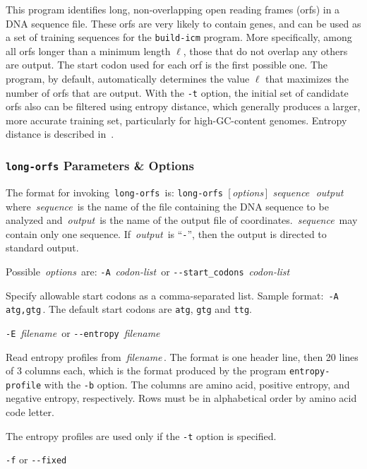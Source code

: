 \documentclass[fleqn,titlepage,11pt]{article}
\def\Desc#1{\,\mbox{\emph{#1}}\,}
\def\Pg#1{\texttt{#1}}
\begin{document}
This program identifies long, non-overlapping open reading frames (orfs)
in a DNA sequence file.  These orfs are very likely to contain genes,
and can be used as a set of training sequences for the \Pg{build-icm}
program.  More specifically, among all orfs longer than a minimum length
$\ell$, those that do not overlap any others are output.  The start
codon used for each orf is the first possible one.  The program, by
default, automatically determines the value $\ell$ that maximizes the
number of orfs that are output.  With the \Pg{-t} option, the initial
set of candidate orfs also can be filtered using entropy distance, which
generally produces a larger, more accurate training set, particularly
for high-GC-content genomes.  Entropy distance is described in~\cite{med1}.

\subsubsection{\Pg{long-orfs} Parameters \& Options}
The format for invoking \,\Pg{long-orfs}\, is:
\bq
  \Pg{long-orfs}\, [\Desc{options}] \Desc{sequence} \Desc{output}
\eq
where \Desc{sequence} is the name of the file containing the DNA sequence
to be analyzed and \Desc{output} is the name of the output file of
coordinates.  \Desc{sequence} may contain only one sequence.
If \Desc{output} is ``\Pg{-}'', then the output is directed to
standard output.

Possible \Desc{options} are:
\bl{}\RaggedRight
\exdent
  \verb`-A` \Desc{codon-list} \enskip or \enskip \verb`--start_codons` \Desc{codon-list}

  Specify allowable start codons as a comma-separated list.
  Sample format:  \,\verb`-A atg,gtg`\,.
  The default start codons are \Pg{atg}, \Pg{gtg} and \Pg{ttg}.

\exdent
  \verb`-E` \Desc{filename} \enskip or \enskip \verb`--entropy` \Desc{filename}

  Read entropy profiles from \Desc{filename}.  The format is one header
  line, then 20 lines of 3 columns each, which is the format produced
  by the program \Pg{entropy-profile} with the \Pg{-b} option.
  The columns are amino acid,
  positive entropy, and negative entropy, respectively.  Rows must be in
  alphabetical order by amino acid code letter.

  The entropy profiles are used only if the \Pg{-t} option is specified.

\exdent
  \verb`-f` \enskip or \enskip \verb`--fixed`
\end{document}
